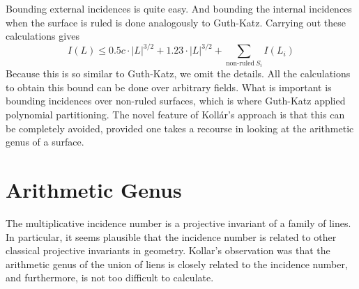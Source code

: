 \documentclass{article}
\theoremstyle{plain}
\begin{document}
Bounding external incidences is quite easy. And bounding the internal incidences when the surface is ruled is done analogously to Guth-Katz. Carrying out these calculations gives
%
\[ I(L) \leq 0.5c \cdot |L|^{3/2} + 1.23 \cdot |L|^{3/2} + \sum_{\text{non-ruled}\ S_i} I(L_i) \]
%
Because this is so similar to Guth-Katz, we omit the details. All the calculations to obtain this bound can be done over arbitrary fields. What is important is bounding incidences over non-ruled surfaces, which is where Guth-Katz applied polynomial partitioning. The novel feature of Koll\'{a}r's approach is that this can be completely avoided, provided one takes a recourse in looking at the arithmetic genus of a surface.

\section{Arithmetic Genus}

The multiplicative incidence number is a projective invariant of a family of lines. In particular, it seems plausible that the incidence number is related to other classical projective invariants in geometry. Kollar's observation was that the arithmetic genus of the union of liens is closely related to the incidence number, and furthermore, is not too difficult to calculate.
\end{document}
